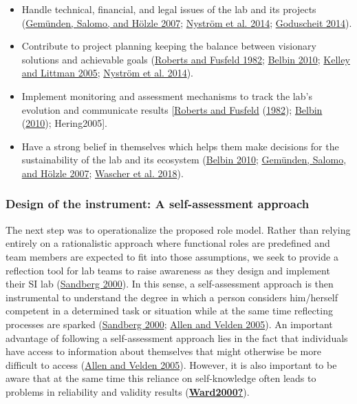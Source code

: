 \documentclass[AMA,STIX1COL,APA,STIX2COL]{WileyNJD-v2}
\providecommand{\tightlist}{%
  \setlength{\itemsep}{0pt}\setlength{\parskip}{0pt}}
\begin{document}
\begin{itemize}
\tightlist
\item
  Handle technical, financial, and legal issues of the lab and its
  projects (\protect\hyperlink{ref-Gemunden2007}{Gemünden, Salomo, and
  Hölzle 2007}; \protect\hyperlink{ref-Nystrom2014}{Nyström et al.
  2014}; \protect\hyperlink{ref-Goduscheit2014}{Goduscheit 2014}).
\item
  Contribute to project planning keeping the balance between visionary
  solutions and achievable goals
  (\protect\hyperlink{ref-Roberts1982}{Roberts and Fusfeld 1982};
  \protect\hyperlink{ref-Belbin2010}{Belbin 2010};
  \protect\hyperlink{ref-Kelley2005}{Kelley and Littman 2005};
  \protect\hyperlink{ref-Nystrom2014}{Nyström et al. 2014}).
\item
  Implement monitoring and assessment mechanisms to track the lab's
  evolution and communicate results
  {[}\protect\hyperlink{ref-Roberts1982}{Roberts and Fusfeld}
  (\protect\hyperlink{ref-Roberts1982}{1982});
  \protect\hyperlink{ref-Belbin2010}{Belbin}
  (\protect\hyperlink{ref-Belbin2010}{2010}); Hering2005{]}.
\item
  Have a strong belief in themselves which helps them make decisions for
  the sustainability of the lab and its ecosystem
  (\protect\hyperlink{ref-Belbin2010}{Belbin 2010};
  \protect\hyperlink{ref-Gemunden2007}{Gemünden, Salomo, and Hölzle
  2007}; \protect\hyperlink{ref-Wascher2018}{Wascher et al. 2018}).
\end{itemize}

\hypertarget{design-of-the-instrument-a-self-assessment-approach}{%
\subsubsection{Design of the instrument: A self-assessment
approach}\label{design-of-the-instrument-a-self-assessment-approach}}

The next step was to operationalize the proposed role model. Rather than
relying entirely on a rationalistic approach where functional roles are
predefined and team members are expected to fit into those assumptions,
we seek to provide a reflection tool for lab teams to raise awareness as
they design and implement their SI lab
(\protect\hyperlink{ref-Sandberg2000}{Sandberg 2000}). In this sense, a
self-assessment approach is then instrumental to understand the degree
in which a person considers him/herself competent in a determined task
or situation while at the same time reflecting processes are sparked
(\protect\hyperlink{ref-Sandberg2000}{Sandberg 2000};
\protect\hyperlink{ref-Allen2005}{Allen and Velden 2005}). An important
advantage of following a self-assessment approach lies in the fact that
individuals have access to information about themselves that might
otherwise be more difficult to access
(\protect\hyperlink{ref-Allen2005}{Allen and Velden 2005}). However, it
is also important to be aware that at the same time this reliance on
self-knowledge often leads to problems in reliability and validity
results (\protect\hyperlink{ref-Ward2000}{\textbf{Ward2000?}}).
\end{document}
